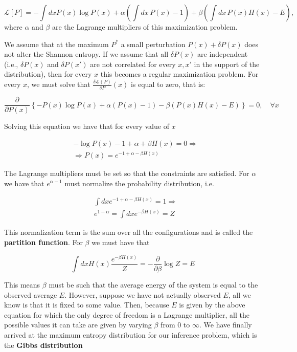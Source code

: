 \begin{equation}
\mathcal{L}[P] =  - \int dx P(x) \log P(x) + \alpha \left(\int dx \, P(x) - 1\right) + \beta \left( \int dx \, P(x) H(x) - E \right),
\end{equation}
where $\alpha$ and $\beta$ are the Lagrange multipliers of this maximization problem. 

We assume that at the maximum $P^\ast$ a small perturbation $P(x) + \delta P(x)$ does not alter the Shannon entropy. If we assume that all $\delta P(x)$ are independent (i.e., $\delta P(x)$ and $\delta P(x')$ are not correlated for every $x, x'$ in the support of the distribution), then for every $x$ this becomes a regular maximization problem. For every $x$, we must solve that $\frac{\delta \mathcal{L}(P)}{\delta P} (x)$ is equal to zero, that is:

\begin{equation}
\frac{\partial}{\partial P(x)}\left\{ -P(x) \log P(x) + \alpha \left(P(x) - 1\right) - \beta \left(P(x) H(x) - E\right) \right\} = 0, \quad \forall x  
\end{equation}

Solving this equation we have that for every value of $x$

\begin{align}
    & -\log P(x) - 1 + \alpha + \beta H(x) = 0 \Rightarrow \\
    & \Rightarrow  P(x) = e^{-1 + \alpha - \beta H(x)}
\end{align}

The Lagrange multipliers must be set so that the constraints are satisfied. For $\alpha$ we have that $e^{\alpha - 1}$ must normalize the probability distribution, i.e.

\begin{align}
   &  \int dx e^{-1 + \alpha - \beta H(x)} = 1 \Rightarrow \\
    & e^{1 - \alpha} = \int dx e^{- \beta H(x)} = Z
\end{align}

This normalization term is the sum over all the configurations and is called the \textbf{partition function}. For $\beta$ we must have that 

\begin{equation}
    \int dx H(x) \frac{e^{-\beta H(x)}}{Z} = - \frac{\partial}{\partial \beta} \log Z = E
\end{equation}

This means $\beta$ must be such that the average energy of the system is equal to the observed average $E$. However, suppose we have not actually observed $E$, all we know is that it is fixed to some  value. Then, because $E$ is given by the above equation for which the only degree of freedom is a Lagrange multiplier, all the possible values it can take are given by varying $\beta$ from 0 to $\infty$. We have finally arrived at the maximum entropy distribution for our inference problem, which is the \textbf{Gibbs distribution}

